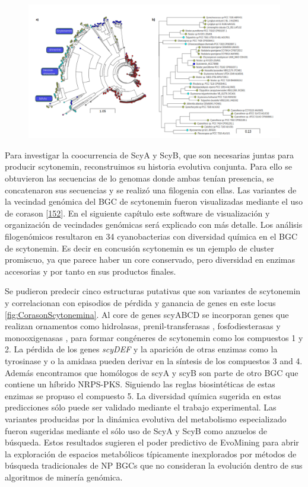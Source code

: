 \documentclass[12pt,twoside]{reedthesis}
\begin{document}
  \begin{figure}[h!tbp]
  \centering
  \includegraphics[angle = 0,scale = .48]{EvoMining/supplementary/AroB.png}
  \caption[AroB en Cyanobacteria]{\footnotesize{}}
  \label{fig:AroB}
  \end{figure}
  
  Para investigar la coocurrencia de ScyA y ScyB, que son necesarias
  juntas para producir scytonemin, reconstruimos su historia evolutiva
  conjunta. Para ello se obtuvieron las secuencias de lo genomas donde
  ambas tenían presencia, se concatenaron sus secuencias y se realizó una
  filogenia con ellas. Las variantes de la vecindad genómica del BGC de
  scytonemin fueron visualizadas mediante el uso de corason
  {[}\protect\hyperlink{ref-navarro-munoz_computational_2018}{152}{]}. En
  el siguiente capítulo este software de visualización y organización de
  vecindades genómicas será explicado con más detalle. Los análisis
  filogenómicos resultaron en 34 cyanobacterias con diversidad química en
  el BGC de scytonemin. Es decir en concusión scytonemin es un ejemplo de
  cluster promiscuo, ya que parece haber un core conservado, pero
  diversidad en enzimas accesorias y por tanto en sus productos finales.
  
  Se pudieron predecir cinco estructuras putativas que son variantes de
  scytonemin y correlacionan con episodios de pérdida y ganancia de genes
  en este locus \autoref{fig:CorasonScytonemina}. Al core de genes scyABCD
  se incorporan genes que realizan ornamentos como hidrolasas,
  prenil-transferasas , fosfodiesterasas y monooxigenasas , para formar
  congéneres de scytonemin como los compuestos 1 y 2. La pérdida de los
  genes \emph{scyDEF} y la aparición de otras enzimas como la tyrosinase y
  o la amidasa pueden derivar en la síntesis de los compuestos 3 and 4.
  Además encontramos que homólogos de scyA y scyB son parte de otro BGC
  que contiene un híbrido NRPS-PKS. Siguiendo las reglas biosintéticas de
  estas enzimas se propuso el compuesto 5. La diversidad química sugerida
  en estas predicciones sólo puede ser validado mediante el trabajo
  experimental. Las variantes producidas por la dinámica evolutiva del
  metabolismo especializado fueron sugeridas mediante el sólo uso de ScyA
  y ScyB como anzuelos de búsqueda. Estos resultados sugieren el poder
  predictivo de EvoMining para abrir la exploración de espacios
  metabólicos típicamente inexplorados por métodos de búsqueda
  tradicionales de NP BGCs que no consideran la evolución dentro de sus
  algoritmos de minería genómica.
  
\end{document}
